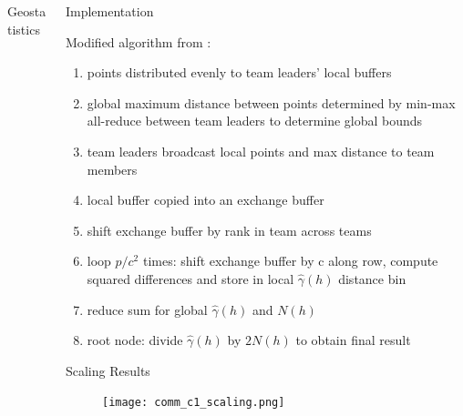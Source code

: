 \documentclass[serif,mathserif,final]{beamer}
\begin{document}
\begin{frame}{}
\begin{columns}[t]
\begin{column}{0.32\linewidth}
\begin{block}{Geostatistics}
      \end{block}
  

    \end{column}%

    \begin{column}{0.32\linewidth}

      \begin{block}{Implementation}
	
      \begin{flushleft} Modified algorithm from \cite{Koanantakool}:
        \begin{enumerate}
          \item points distributed evenly to team leaders' local buffers
          \item global maximum distance between points determined by min-max all-reduce between team leaders to determine global bounds
          \item team leaders broadcast local points and max distance to team members
          \item local buffer copied into an exchange buffer
          \item shift exchange buffer by rank in team across teams
          \item loop $p/c^2$ times: shift exchange buffer by c along row, compute squared differences and store in local $\hat{\gamma}(h)$ distance bin
          \item reduce sum for global $\hat{\gamma}(h)$ and $N(h)$
          \item root node: divide $\hat{\gamma}(h)$ by $2N(h)$ to obtain final result
        \end{enumerate}
        \end{flushleft}
      \end{block}
      
    
      
       \begin{block}{Scaling Results}
        \begin{figure}[htbp]
            \centering
            \texttt{[image: comm\_c1\_scaling.png]} %
            \label{fig:plot}
         \end{figure}
      \end{block}

    \end{column}%


\end{columns}
\end{frame}
\end{document}

